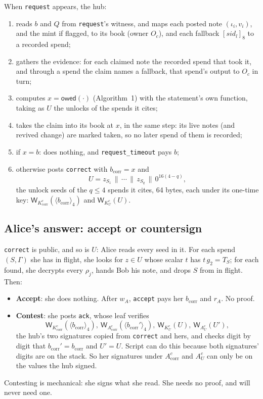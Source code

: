 \documentclass[11pt]{article}
\theoremstyle{plain}
\theoremstyle{definition}
\newcommand{\bcorr}{b_{\mathrm{corr}}}
\newcommand{\tx}[1]{\texttt{#1}}
\newcommand{\be}[2]{\langle #1\rangle_{#2}}
\newcommand{\pre}[2]{[#1]_{#2}}
\newcommand{\Wots}{\mathsf{W}}
\newcommand{\sid}{\mathit{sid}}
\newcommand{\owed}{\mathsf{owed}}
\newcommand{\Oc}{O_c}
\newcommand{\Kcorr}{K_{\mathrm{corr}}^{c}}
\newcommand{\KU}{K_{U}^{c}}
\newcommand{\Acorr}{A_{\mathrm{corr}}^{c}}
\newcommand{\AU}{A_{U}^{c}}
\begin{document}
When \tx{request} appears, the hub:
\begin{enumerate}[nosep]
\item reads $b$ and $Q$ from \tx{request}'s witness, and maps each posted
  note $(\iota_i, v_i)$, and the mint if flagged, to its book (owner
  $\Oc$), and each fallback
  $\pre{\sid_l}{8}$ to a recorded spend;
\item gathers the evidence: for each claimed note the recorded spend that
  took it, and through a spend the claim names a fallback, that spend's
  output to $\Oc$ in turn;
\item computes $x = \owed(\cdot)$ (Algorithm~1) with the statement's own
  function, taking as $U$ the unlocks of the spends it cites;
\item takes the claim into its book at $x$, in the same step: its live
  notes (and revived change) are marked taken, so no later spend of them
  is recorded;
\item if $x = b$: does nothing, and \tx{request\_timeout} pays $b$;
\item otherwise posts \tx{correct} with $\bcorr = x$ and
  \[
    U = z_{S_1} \,\|\, \cdots \,\|\, z_{S_q} \,\|\, 0^{16(4 - q)},
  \]
  the unlock seeds of the $q \le 4$ spends it cites, 64 bytes, each
  under its one-time key: $\Wots_{\Kcorr}(\be{\bcorr}{4})$ and
  $\Wots_{\KU}(U)$.
\end{enumerate}

\subsection{Alice's answer: accept or countersign}\label{sec:ack}

\tx{correct} is public, and so is $U$: Alice reads every seed in it.
For each spend $(S, \Gamma)$ she has in flight, she looks for $z \in U$
whose scalar $t$ has $t\,g_2 = T_S$; for each found, she decrypts every
$\rho_j$, hands Bob his note, and drops $S$ from in flight. Then:
\begin{itemize}[nosep]
\item \textbf{Accept}: she does nothing. After $w_A$, \tx{accept} pays
  her $\bcorr$ and $r_A$. No proof.
\item \textbf{Contest}: she posts \tx{ack}, whose leaf verifies
  \[
    \Wots_{\Kcorr}(\be{\bcorr}{4}),\ \Wots_{\Acorr}(\be{\bcorr'}{4}),\
    \Wots_{\KU}(U),\ \Wots_{\AU}(U'),
  \]
  the hub's two signatures copied from \tx{correct} and hers, and checks
  digit by digit that $\bcorr' = \bcorr$ and $U' = U$. Script can do
  this because both signatures' digits are on the stack. So her
  signatures under $\Acorr$ and $\AU$ can only be on the values the hub
  signed.
\end{itemize}
Contesting is mechanical: she signs what she read. She needs no proof,
and will never need one.
\end{document}
